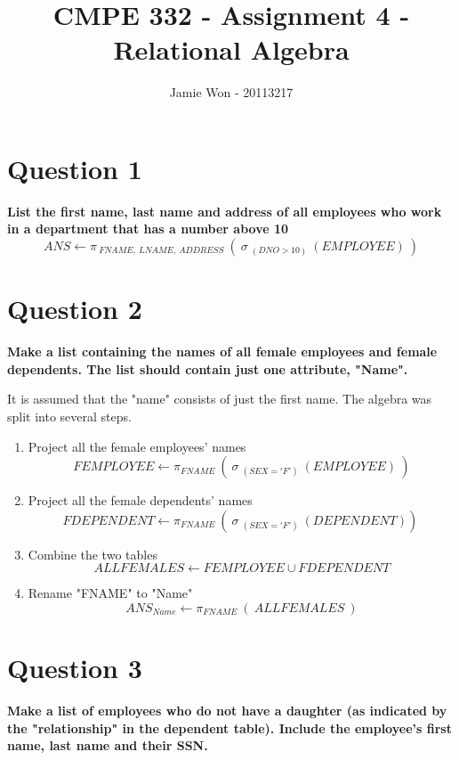 \documentclass{article}
\title{CMPE 332 - Assignment 4 - Relational Algebra}
\author{Jamie Won - 20113217}
\begin{document}
\setcounter{secnumdepth}{0}
\maketitle
\tableofcontents
\cleardoublepage

\section{Question 1}

    \textbf{List the first name, last name and address of all employees who work in a department that has a number above 10}
    \[ ANS \gets \pi _{\: FNAME, \: LNAME, \: ADDRESS} \: ( \: \sigma \: _{(DNO > 10)} \: (EMPLOYEE) \: )\]

\section{Question 2}

    \textbf{Make a list containing the names of all female employees and female dependents.  The list should contain just one attribute, "Name".}

    It is assumed that the "name" consists of just the first name. The algebra was split into several steps.
    
    \begin{enumerate}
        \item Project all the female employees' names
        \[ FEMPLOYEE \gets \pi _{FNAME} \: ( \: \sigma \: _{(SEX = 'F')} \: (EMPLOYEE) \: )\]
        \item Project all the female dependents' names
        \[ FDEPENDENT \gets \pi _{FNAME} \: ( \: \sigma \: _{(SEX = 'F')} \: (DEPENDENT)) \: \]
        \item Combine the two tables
        \[ ALLFEMALES \gets FEMPLOYEE \cup FDEPENDENT \]
        \item Rename "FNAME" to "Name"
        \[ ANS_{Name} \gets \pi _{FNAME} \: ( \: ALLFEMALES \:) \]
    \end{enumerate}
    
\section{Question 3}

    \textbf{Make a list of employees who do not have a daughter (as indicated by the "relationship" in the dependent table).  Include the employee's first name, last name and their SSN.}
\end{document}
